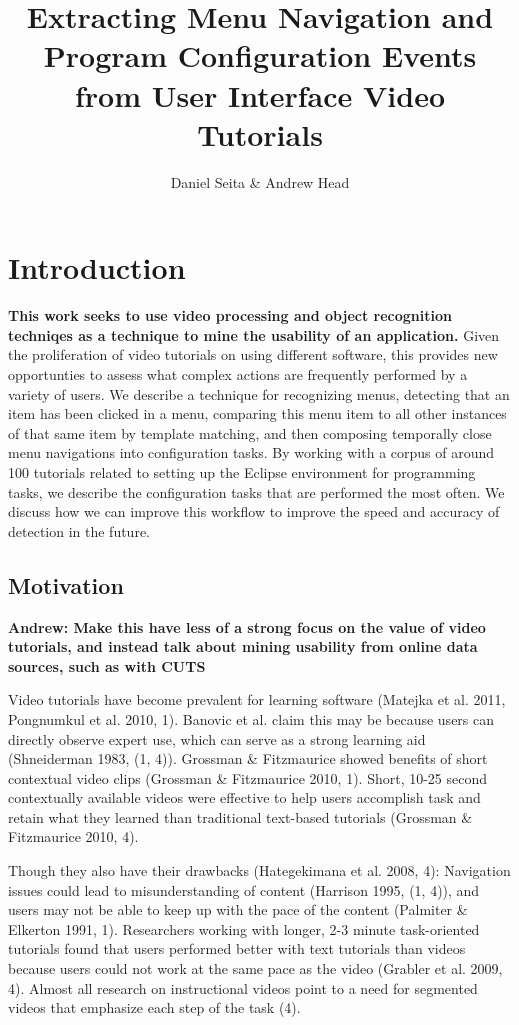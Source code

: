 \documentclass[12pt]{memoir}
\title{Extracting Menu Navigation and Program Configuration Events 
from User Interface Video Tutorials}
\author{Daniel Seita \& Andrew Head}
\begin{document}
\maketitle

\section{Introduction}

\textbf{This work seeks to use video processing and object recognition techniqes as
a technique to mine the usability of an application.}  Given the proliferation
of video tutorials on using different software, this provides new opportunties
to assess what complex actions are frequently performed by a variety of users.
We describe a technique for recognizing menus, detecting that an item has
been clicked in a menu, comparing this menu item to all other instances of
that same item by template matching, and then composing temporally close
menu navigations into configuration tasks.  By working with a corpus of
around 100 tutorials related to setting up the Eclipse environment for
programming tasks, we describe the configuration tasks that are performed
the most often.  We discuss how we can improve this workflow to improve the
speed and accuracy of detection in the future.

\subsection{Motivation}

\textbf{Andrew: Make this have less of a strong focus on the value of
video tutorials, and instead talk about mining usability from online data
sources, such as with CUTS}

Video tutorials have become prevalent for learning software (Matejka et al. 2011, 
Pongnumkul et al. 2010, 1).  Banovic et al. claim this may be because users 
can directly observe expert use, which can serve as a strong learning aid 
(Shneiderman 1983, (1, 4)).  Grossman \& Fitzmaurice showed benefits of short 
contextual video clips (Grossman \& Fitzmaurice 2010, 1).  Short, 10-25 second 
contextually available videos were effective to help users accomplish task and 
retain what they learned than traditional text-based tutorials (Grossman \& 
Fitzmaurice 2010, 4).

Though they also have their drawbacks (Hategekimana et al. 2008, 4):  
Navigation issues could lead to misunderstanding of content (Harrison 1995, 
(1, 4)), and users may not be able to keep up with the pace of the content 
(Palmiter \& Elkerton 1991, 1).  Researchers working with longer, 2-3 minute 
task-oriented tutorials found that users performed better with text tutorials 
than videos because users could not work at the same pace as the video 
(Grabler et al. 2009, 4).  Almost all research on instructional videos point 
to a need for segmented videos that emphasize each step of the task (4).
\end{document}
